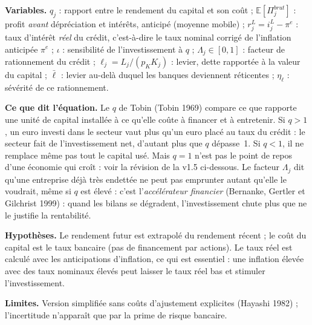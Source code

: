 \documentclass[11pt,a4paper]{article}
\newcommand{\variables}{\par\noindent\textbf{Variables.} }
\newcommand{\sens}{\par\noindent\textbf{Ce que dit l'équation.} }
\newcommand{\hyp}{\par\noindent\textbf{Hypothèses.} }
\newcommand{\limites}{\par\noindent\textbf{Limites.} }
\newcommand{\E}{\mathbb{E}}
\begin{document}
\begin{lecture}
\variables $q_j$ : rapport entre le rendement du capital et son coût ; $\E[\Pi^{brut}_j]$ : profit \emph{avant} dépréciation et intérêts, anticipé (moyenne mobile) ; $r^L_j = i^L_j - \pi^e$ : taux d'intérêt \emph{réel} du crédit, c'est-à-dire le taux nominal corrigé de l'inflation anticipée $\pi^e$ ; $\iota$ : sensibilité de l'investissement à $q$ ; $\Lambda_j\in[0,1]$ : facteur de rationnement du crédit ; $\ell_j = L_j/(p_K K_j)$ : levier, dette rapportée à la valeur du capital ; $\bar\ell$ : levier au-delà duquel les banques deviennent réticentes ; $\eta_\ell$ : sévérité de ce rationnement.
\sens Le $q$ de Tobin (Tobin 1969) compare ce que rapporte une unité de capital installée à ce qu'elle coûte à financer et à entretenir. Si $q>1$, un euro investi dans le secteur vaut plus qu'un euro placé au taux du crédit : le secteur fait de l'investissement net, d'autant plus que $q$ dépasse~1. Si $q<1$, il ne remplace même pas tout le capital usé. Mais $q=1$ n'est pas le point de repos d'une économie qui croît : voir la révision de la v1.5 ci-dessous. Le facteur $\Lambda_j$ dit qu'une entreprise déjà très endettée ne peut pas emprunter autant qu'elle le voudrait, même si $q$ est élevé : c'est l'\emph{accélérateur financier} (Bernanke, Gertler et Gilchrist 1999) : quand les bilans se dégradent, l'investissement chute plus que ne le justifie la rentabilité.
\hyp Le rendement futur est extrapolé du rendement récent ; le coût du capital est le taux bancaire (pas de financement par actions). Le taux réel est calculé avec les anticipations d'inflation, ce qui est essentiel : une inflation élevée avec des taux nominaux élevés peut laisser le taux réel bas et stimuler l'investissement.
\limites Version simplifiée sans coûts d'ajustement explicites (Hayashi 1982) ; l'incertitude n'apparaît que par la prime de risque bancaire.

\end{lecture}
\end{document}
